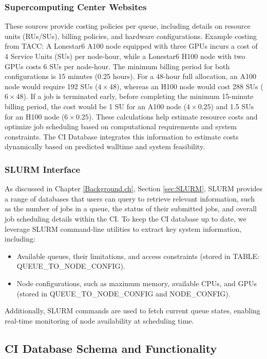 \subsubsection{Supercomputing Center Websites}
These sources provide costing policies per queue, including details on resource units (RUs/SUs), billing policies, and hardware configurations. Example costing from TACC: A Lonestar6 A100 node equipped with three GPUs incurs a cost of 4 Service Units (SUs) per node-hour, while a Lonestar6 H100 node with two GPUs costs 6 SUs per node-hour. The minimum billing period for both configurations is 15 minutes (0.25 hours). For a 48-hour full allocation, an A100 node would require 192 SUs (\(4 \times 48\)), whereas an H100 node would cost 288 SUs (\(6 \times 48\)). If a job is terminated early, before completing the minimum 15-minute billing period, the cost would be 1 SU for an A100 node (\(4 \times 0.25\)) and 1.5 SUs for an H100 node (\(6 \times 0.25\)). These calculations help estimate resource costs and optimize job scheduling based on computational requirements and system constraints. The CI Database integrates this information to estimate costs dynamically based on predicted walltime and system feasibility.

\subsubsection{SLURM Interface}
As discussed in Chapter \ref{Background.ch}, Section \ref{sec:SLURM}, SLURM provides a range of databases that users can query to retrieve relevant information, such as the number of jobs in a queue, the status of their submitted jobs, and overall job scheduling details within the CI. To keep the CI database up to date, we leverage SLURM command-line utilities to extract key system information, including:

\begin{itemize}
    \item Available queues, their limitations, and access constraints (stored in TABLE: QUEUE\_TO\_NODE\_CONFIG).
    \item Node configurations, such as maximum memory, available CPUs, and GPUs (stored in QUEUE\_TO\_NODE\_CONFIG and NODE\_CONFIG).
\end{itemize}

Additionally, SLURM commands are used to fetch current queue states, enabling real-time monitoring of node availability at scheduling time.

\subsection{CI Database Schema and Functionality}

